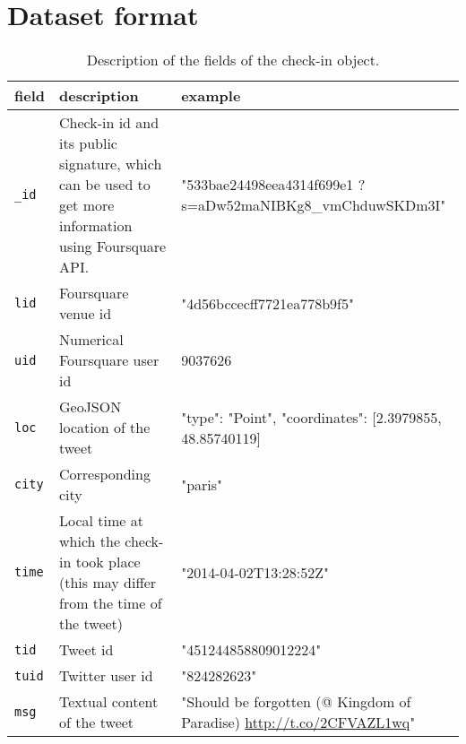 \clearpage
{}
\chapter{Dataset format}
\label{chap:appendix}

\begin{table}[ht]
    \centering
    \begin{tabularx}{\textwidth}{lXX}
        \toprule
        field & description & example\\
        \midrule
        \texttt{\_id} & Check-in id and its public signature, which can be
used to get more information using Foursquare API. &
"533bae24498eea4314f699e1
?s=aDw52maNIBKg8\_vmChduwSKDm3I" \\
        \texttt{lid} & Foursquare venue id & "4d56bccecff7721ea778b9f5"\\
        \texttt{uid} & Numerical Foursquare user id & 9037626\\
        \texttt{loc} & GeoJSON location of the tweet & {"type": "Point", "coordinates": [2.3979855, 48.85740119]}\\
        \texttt{city} & Corresponding city & "paris"\\
        \texttt{time} & Local time at which the check-in took place (this may
differ from the time of the tweet) & "2014-04-02T13:28:52Z"\\
        \texttt{tid} & Tweet id & "451244858809012224"\\
        \texttt{tuid} & Twitter user id & "824282623"\\
        \texttt{msg} & Textual content of the tweet & "Should be forgotten (@
Kingdom of Paradise) \url{http://t.co/2CFVAZL1wq}"\\
        \bottomrule
    \end{tabularx}
    \caption[Check-in format]{Description of the fields of the check-in
    object.\label{tab:checkinfields}}
\end{table}

